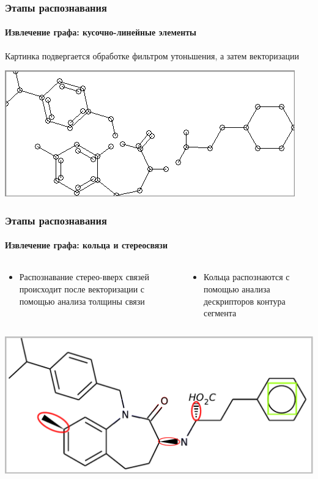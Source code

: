 \begin{frame}
  \frametitle{Этапы распознавания}
  \framesubtitle{Извлечение графа: кусочно-линейные элементы}
  Картинка подвергается обработке фильтром утоньшения, а затем векторизации
  \begin{center}
  \includegraphics[scale=0.7]{media/ggg1.png}
  \end{center}
\end{frame}

\begin{frame}
  \frametitle{Этапы распознавания}
  \framesubtitle{Извлечение графа: кольца и стереосвязи}
  \begin{columns}
    \begin{column}{0.5\textwidth}
      \begin{itemize}
        \item Распознавание стерео-вверх связей происходит после векторизации с помощью анализа толщины связи 
      \end{itemize}
    \end{column}
    \begin{column}{0.5\textwidth}
      \begin{itemize}
        \item Кольца распознаются с помощью анализа дескрипторов контура сегмента
      \end{itemize}
    \end{column}
  \end{columns}
  \begin{center}
  \includegraphics[scale=0.7]{media/mol3.pdf}
  \end{center}
\end{frame}

